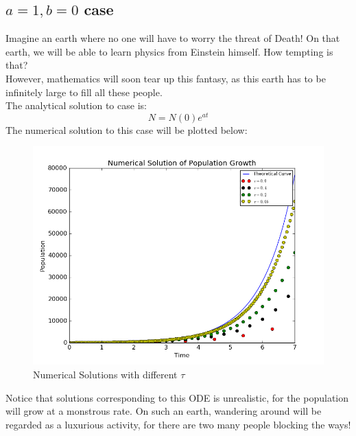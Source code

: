 \documentclass[10pt,a4paper]{article}
\begin{document}
    \subsection{$a=1, b=0$ case}
    Imagine an earth where no one will have to worry the threat of Death! On that earth, we will be able to learn physics from Einstein himself. How tempting is that?\\
    However, mathematics will soon tear up this fantasy, as this earth has to be infinitely large to fill all these people.\\   
    The analytical solution to case is:
    \begin{equation}
    N=N(0)e^{at}
    \end{equation}
    The numerical solution to this case will be plotted below:
    \begin{figure}[htbp]
    	\centering
    	\includegraphics[width=5in]{Population.png}
    	\caption{Numerical Solutions with different $\tau$}
    \end{figure}
    Notice that solutions corresponding to this ODE is unrealistic, for the population will grow at a monstrous rate. On such an earth, wandering around will be regarded as a luxurious activity, for there are two many people blocking the ways!
    
\end{document}

